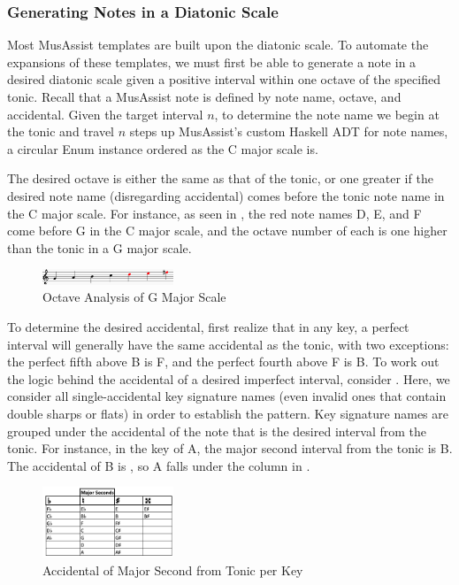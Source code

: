 \documentclass{article}
\begin{document}
\subsubsection{Generating Notes in a Diatonic Scale}
\label{sec:note_generate}
Most MusAssist templates are built upon the diatonic scale. To automate the expansions of these templates, we must first be able to generate a note in a desired diatonic scale given a positive interval within one octave of the specified tonic. Recall that a MusAssist note is defined by note name, octave, and accidental. Given the target interval $n$, to determine the note name we begin at the tonic and travel $n$ steps up MusAssist’s custom Haskell ADT for note names, a circular Enum instance ordered as the C major scale is. 

The desired octave is either the same as that of the tonic, or one greater if the desired note name (disregarding accidental) comes before the tonic note name in the C major scale. For instance, as seen in , the red note names D, E, and F come before G in the C major scale, and the octave number of each is one higher than the tonic in a G major scale.

\vspace{-2mm}
\begin{figure}[h!]
\centering
\includegraphics[width=0.35\textwidth]{images/note_octave_logic}
\caption{\centering Octave Analysis of G Major Scale}
\label{note_octaves}
\vspace{-3mm}
\end{figure}

To determine the desired accidental, first realize that in any key, a perfect interval will generally have the same accidental as the tonic, with two exceptions: the perfect fifth above B is F\musSharp, and the perfect fourth above F is B\musFlat. To work out the logic behind the accidental of a desired imperfect interval, consider . Here, we consider all single-accidental key signature names (even invalid ones that contain double sharps or flats) in order to establish the pattern. Key signature names are grouped under the accidental of the note that is the desired interval from the tonic. For instance, in the key of A\musFlat\;, the major second interval from the tonic is B\musFlat. The accidental of B\musFlat\; is \musFlat, so A\musFlat\; falls under the \musFlat\; column in .
\vspace{-2mm}
\begin{figure}[h!]
\centering
\includegraphics[width=0.35\textwidth]{images/maj_seconds}
\caption{Accidental of Major Second from Tonic per Key}
\label{maj_seconds}
\vspace{-2mm}
\end{figure}
\end{document}
